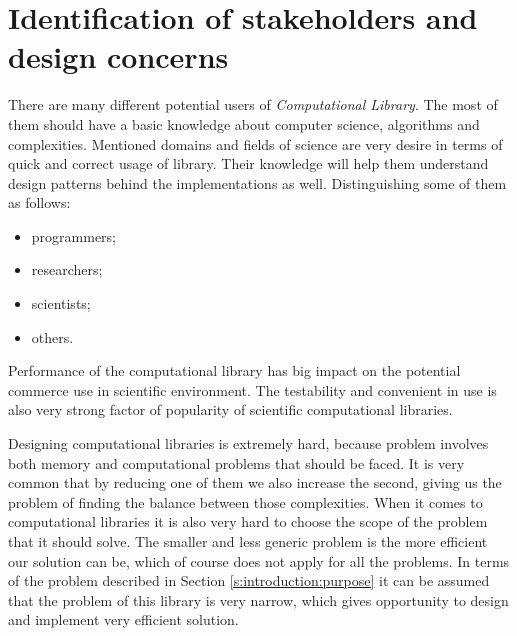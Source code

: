 \chapter{Identification of stakeholders and design concerns} \label{chp:identification-of-stakeholders-and-design-concerns}
	\begin{comment}
		An SDD shall identify the design stakeholders for the design subject.
		An SDD shall identify the design concerns of each identified design stakeholder.
		An SDD shall address each identified design concern.
		NOTE—An SDD can be used to satisfy the content guidelines for several types of design description as defined in
		ISO/IEC 15289:2006 [B25], by identifying their content guidelines as design concerns. The types of design
		descriptions are as follows: database design description (10.14),6 database detailed design description (10.15), highlevel
		software design description (10.22), interface description (10.27), low-level software design description (10.29),
		system description (10.71), and system element description (10.72).
	\end{comment}

	There are many different potential users of \emph{Computational Library}. The most of them should have a basic knowledge about computer science, algorithms and complexities. Mentioned domains and fields of science are very desire in terms of quick and correct usage of library. Their knowledge will help them understand design patterns behind the implementations as well. Distinguishing some of them as follows: 
	\begin{itemize}
		\item programmers;
		\item researchers;
		\item scientists;
		\item others.
	\end{itemize}
	Performance of the computational library has big impact on the potential commerce use in scientific environment. The testability and convenient in use is also very strong factor of popularity of scientific computational libraries. 
	
	Designing computational libraries is extremely hard, because problem involves both memory and computational problems that should be faced. It is very common that by reducing one of them we also increase the second, giving us the problem of finding the balance between those complexities. When it comes to computational libraries it is also very hard to choose the scope of the problem that it should solve. The smaller and less generic problem is the more efficient our solution can be, which of course does not apply for all the problems. In terms of the problem described in Section \ref{s:introduction:purpose} it can be assumed that the problem of this library is very narrow, which gives opportunity to design and implement very efficient solution.
